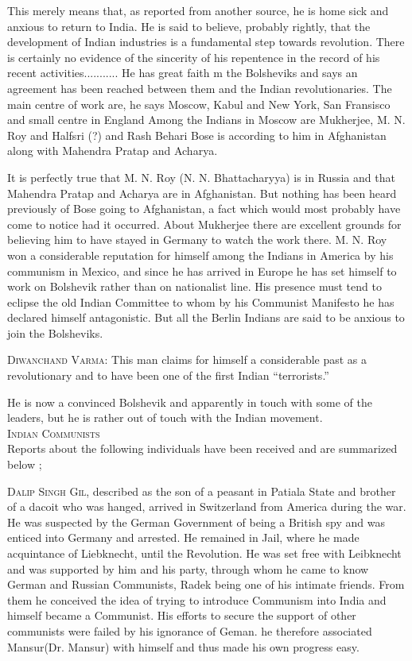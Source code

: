 This merely means that, as reported from another source, he is home sick and anxious to return to India. He is said to believe, probably rightly, that the development of Indian industries is a fundamental step towards revolution. There is certainly no evidence of the sincerity of his repentence in the record of his recent activities........... He has great faith m the Bolsheviks and says an agreement has been reached between them and the Indian revolutionaries. The main centre of work are, he says Moscow, Kabul and New York, San Fransisco and small centre in England Among the Indians in Moscow are Mukherjee, M. N. Roy and Halfsri (?) and Rash Behari Bose is according to him in Afghanistan along with Mahendra Pratap and Acharya. 

It is perfectly true that M. N. Roy (N. N. Bhattacharyya) is in Russia and that Mahendra Pratap and Acharya are in Afghanistan. But nothing has been heard previously of Bose going to Afghanistan, a fact which would most probably have come to notice had it occurred. About Mukherjee there are excellent grounds for believing him to have stayed in Germany to watch the work there. M. N. Roy won a considerable reputation for himself among the Indians in America by his communism in Mexico, and since he has arrived in Europe he has set himself to work on Bolshevik rather than on nationalist line. His presence must tend to eclipse the old 
Indian Committee to whom by his Communist Manifesto he has declared himself antagonistic. But all the Berlin Indians are said to be anxious to join the Bolsheviks. 

\textsc{Diwanchand Varma:} This man claims for himself a considerable past as a revolutionary and to have been one of the first Indian “terrorists.” 

He is now a convinced Bolshevik and apparently in touch with some of the leaders, but he is rather out of touch with the Indian movement. \\


\textsc{Indian Communists}\\

Reports about the following individuals have been received and are summarized below ; 

\textsc{Dalip Singh Gil}, described as the son of a peasant in Patiala State and brother of a dacoit who was hanged, arrived in Switzerland from America during the war. He was suspected by the German Government of being a British spy and was enticed into Germany and arrested. He remained in Jail, where he made acquintance of Liebknecht, until the Revolution. He was set free with Leibknecht and was supported by him and his party, through whom he came to know 
German and Russian Communists, Radek being one of his intimate friends. From them he conceived the idea of trying to introduce Communism into India and himself became a Communist. His efforts to secure the support of other communists were failed by his ignorance of Geman. he therefore  associated Mansur(Dr. Mansur) with himself and thus made his own progress easy.

